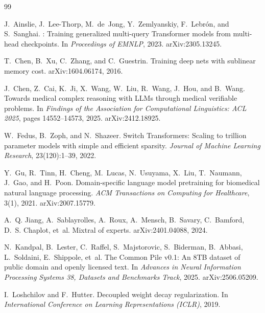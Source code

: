 \documentclass[11pt,a4paper]{article}
\begin{document}
\begin{thebibliography}{99}
\providecommand{\natexlab}[1]{#1}

J.~Ainslie, J.~Lee-Thorp, M.~de~Jong, Y.~Zemlyanskiy, F.~Lebr\'on, and S.~Sanghai.
: Training generalized multi-query Transformer models from multi-head checkpoints.
\newblock In \emph{Proceedings of EMNLP}, 2023. arXiv:2305.13245.

T.~Chen, B.~Xu, C.~Zhang, and C.~Guestrin.
\newblock Training deep nets with sublinear memory cost.
\newblock arXiv:1604.06174, 2016.

J.~Chen, Z.~Cai, K.~Ji, X.~Wang, W.~Liu, R.~Wang, J.~Hou, and B.~Wang.
\newblock Towards medical complex reasoning with {LLMs} through medical verifiable problems.
\newblock In \emph{Findings of the Association for Computational Linguistics: ACL 2025}, pages 14552--14573, 2025. arXiv:2412.18925.

W.~Fedus, B.~Zoph, and N.~Shazeer.
\newblock Switch Transformers: Scaling to trillion parameter models with simple and efficient sparsity.
\newblock \emph{Journal of Machine Learning Research}, 23(120):1--39, 2022.

Y.~Gu, R.~Tinn, H.~Cheng, M.~Lucas, N.~Usuyama, X.~Liu, T.~Naumann, J.~Gao, and H.~Poon.
\newblock Domain-specific language model pretraining for biomedical natural language processing.
\newblock \emph{ACM Transactions on Computing for Healthcare}, 3(1), 2021. arXiv:2007.15779.

A.~Q. Jiang, A.~Sablayrolles, A.~Roux, A.~Mensch, B.~Savary, C.~Bamford, D.~S. Chaplot, et~al.
\newblock Mixtral of experts.
\newblock arXiv:2401.04088, 2024.

N.~Kandpal, B.~Lester, C.~Raffel, S.~Majstorovic, S.~Biderman, B.~Abbasi, L.~Soldaini, E.~Shippole, et~al.
\newblock The Common Pile v0.1: An 8{TB} dataset of public domain and openly licensed text.
\newblock In \emph{Advances in Neural Information Processing Systems 38, Datasets and Benchmarks Track}, 2025. arXiv:2506.05209.

I.~Loshchilov and F.~Hutter.
\newblock Decoupled weight decay regularization.
\newblock In \emph{International Conference on Learning Representations (ICLR)}, 2019.


\end{thebibliography}
\end{document}
